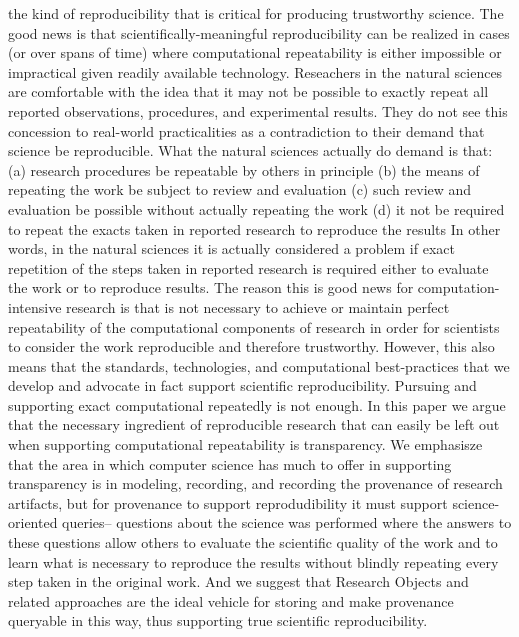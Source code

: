 		the kind of reproducibility that is critical for producing trustworthy science.
	The good news is that scientifically-meaningful reproducibility can be realized in cases (or over spans of time)
		where computational repeatability is either impossible or impractical given readily available technology.
	Reseachers in the natural sciences are comfortable with the idea that it may not be possible to exactly
		repeat all reported observations, procedures, and experimental results.
	They do not see this concession to real-world practicalities as a contradiction to their demand that science be reproducible.
	What the natural sciences actually do demand is that:
		(a) research procedures be repeatable by others in principle
		(b) the means of repeating the work be subject to review and evaluation
		(c) such review and evaluation be possible without actually repeating the work
		(d) it not be required to repeat the exacts taken in reported research to reproduce the results
	In other words, in the natural sciences it is actually considered a problem if exact repetition of the steps taken in reported research
		is required either to evaluate the work or to reproduce results.
	The reason this is good news for computation-intensive research is that is not necessary to achieve or maintain perfect repeatability
		of the computational components of research in order for scientists to consider the work reproducible and therefore trustworthy.
	However, this also means that the standards, technologies, and computational best-practices that we develop and advocate
		in fact support scientific reproducibility. Pursuing and supporting exact computational repeatedly is not enough.
	In this paper we argue that the necessary ingredient of reproducible research that can easily be left out when supporting computational
		repeatability is transparency.
	We emphasisze that the area in which computer science has much to offer in supporting transparency is in modeling, recording, and recording
		the provenance of research artifacts, but for provenance to support reprodudibility it must support science-oriented queries--
		questions about the science was performed where the answers to these questions allow others to evaluate the scientific
		quality of the work and to learn what is necessary to reproduce the results without blindly repeating every step taken in the
		original work.
	And we suggest that Research Objects and related approaches are the ideal vehicle for storing and make provenance queryable
		in this way, thus supporting true scientific reproducibility.


